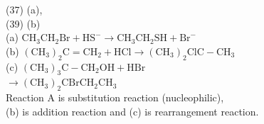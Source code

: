 \documentclass[10pt]{article}
\begin{document}
(37) (a),\\
(39) (b)\\
(a) $\mathrm{CH}_{3} \mathrm{CH}_{2} \mathrm{Br}+\mathrm{HS}^{-} \longrightarrow \mathrm{CH}_{3} \mathrm{CH}_{2} \mathrm{SH}+\mathrm{Br}^{-}$\\
(b) $\left(\mathrm{CH}_{3}\right)_{2} \mathrm{C}=\mathrm{CH}_{2}+\mathrm{HCl} \longrightarrow\left(\mathrm{CH}_{3}\right)_{2} \mathrm{ClC}-\mathrm{CH}_{3}$\\
(c) $\left(\mathrm{CH}_{3}\right)_{3} \mathrm{C}-\mathrm{CH}_{2} \mathrm{OH}+\mathrm{HBr}$\\
$\longrightarrow\left(\mathrm{CH}_{3}\right)_{2} \mathrm{CBrCH}_{2} \mathrm{CH}_{3}$\\
Reaction A is substitution reaction (nucleophilic),\\
(b) is addition reaction and (c) is rearrangement reaction.
\end{document}
